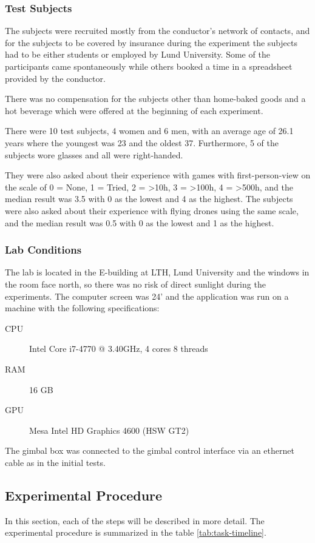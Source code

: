 \documentclass[nofilelist]{cslthse-msc}
\begin{document}
\subsubsection{Test Subjects}
The subjects were recruited mostly from the conductor's network of contacts, and for the subjects to be covered by insurance during the experiment the subjects had to be either students or employed by Lund University. Some of the participants came spontaneously while others booked a time in a spreadsheet provided by the conductor.

There was no compensation for the subjects other than home-baked goods and a hot beverage which were offered at the beginning of each experiment.

There were 10 test subjects, 4 women and 6 men, with an average age of 26.1 years where the youngest was 23 and the oldest 37. Furthermore, 5 of the subjects wore glasses and all were right-handed. 

They were also asked about their experience with games with first-person-view on the scale of 0 = None, 1 = Tried, 2 = >10h, 3 = >100h, 4 = >500h, and the median result was 3.5 with 0 as the lowest and 4 as the highest. The subjects were also asked about their experience with flying drones using the same scale, and the median result was 0.5 with 0 as the lowest and 1 as the highest. 

\subsubsection{Lab Conditions}
The lab is located in the E-building at LTH, Lund University and the windows in the room face north, so there was no risk of direct sunlight during the experiments. The computer screen was 24' and the application was run on a machine with the following specifications:
\begin{description}
   \item[CPU] Intel Core i7-4770 @ 3.40GHz, 4 cores 8 threads
   \item[RAM] 16 GB
   \item[GPU] Mesa Intel HD Graphics 4600 (HSW GT2)
\end{description}

The gimbal box was connected to the gimbal control interface via an ethernet cable as in the initial tests.

\subsection{Experimental Procedure}
In this section, each of the steps will be described in more detail. The experimental procedure is summarized in the table \ref{tab:task-timeline}.
\end{document}
